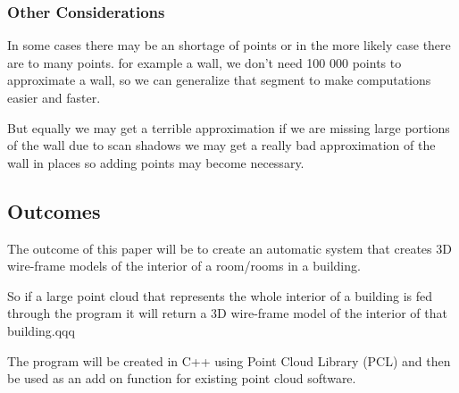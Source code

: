 \subsubsection{Other Considerations}

In some cases there may be an shortage of points or in the more likely case there are to many points. for example a wall, we don't need 100 000 points to approximate a wall, so we can generalize that segment to make computations easier and faster.

But equally we may get a terrible approximation if we are missing large portions of the wall due to scan shadows we may get a really bad approximation of the wall in places so adding points may become necessary.



\subsection{Outcomes}

The outcome of this paper will be to create an automatic system that creates 3D wire-frame models of the interior of a room/rooms in a building. 

So if a large point cloud that represents the whole interior of a building is fed through the program it will return a 3D wire-frame model of the interior of that building.qqq

The program will be created in C++ using Point Cloud Library (PCL) and then be used as an add on function for existing point cloud software.







